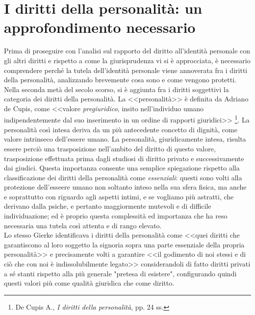 \section{I diritti della personalità: un approfondimento necessario}%
Prima di proseguire con l'analisi sul rapporto del diritto all'identità personale con gli altri diritti e rispetto a come la giurisprudenza vi si è approcciata, 
è necessario comprendere perché la tutela dell'identità personale viene annoverata fra i diritti della personalità, analizzando brevemente cosa sono e come vengono protetti.
\\Nella seconda metà del secolo scorso, si è aggiunta fra i diritti soggettivi la categoria dei diritti della personalità. 
La <<personalità>> è definita da Adriano de Cupis, come <<valore \textit{pregiuridico}, insito nell'individuo umano indipendentemente dal suo inserimento in un ordine di rapporti giuridici>>
\footnote{De Cupis A., \textit{I diritti della personalità}, pp. 24 ss.}. 
La personalità così intesa deriva da un più antecedente concetto di dignità, come valore intrinseco dell'essere umano.
La personalità, giuridicamente intesa, risulta essere perciò una trasposizione nell'ambito del diritto di questo valore, trasposizione effettuata prima dagli studiosi di diritto privato e successivamente dai giudici. Questa importanza consente una semplice spiegazione rispetto alla classificazione dei diritti della personalità come \textit{essenziali}: questi sono volti alla protezione dell'esseere umano non soltanto inteso nella sua sfera fisica, ma anche e soprattutto con riguardo agli aspetti intimi, e se vogliamo più astratti, che derivano dalla psiche, e pertanto maggiormente mutevoli e di difficile individuazione; ed è proprio questa complessità ed importanza che ha reso necessaria una tutela così attenta e di rango elevato. 
\\Lo stesso Gierke identificava i diritti della personalità come <<quei diritti che garantiscono al loro soggetto la signoria sopra una parte essenziale della propria personalità>> e precisamente volti a garantire <<il godimento di noi stessi e di ciò che con noi è indissolubilmente legato>> considerandoli di fatto diritti privati a sé stanti rispetto alla più generale "pretesa di esistere", configurando quindi questi valori più come qualità giuridica che come diritto.

